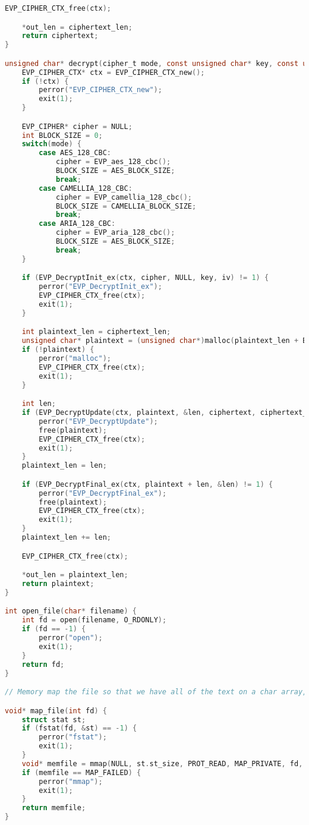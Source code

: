 \documentclass{article}
\begin{document}
\begin{lstlisting}[language=C]
    EVP_CIPHER_CTX_free(ctx);

    *out_len = ciphertext_len;
    return ciphertext;
}

unsigned char* decrypt(cipher_t mode, const unsigned char* key, const unsigned char* iv, const unsigned char* ciphertext, int ciphertext_len, int* out_len) {
    EVP_CIPHER_CTX* ctx = EVP_CIPHER_CTX_new();
    if (!ctx) {
        perror("EVP_CIPHER_CTX_new");
        exit(1);
    }

    EVP_CIPHER* cipher = NULL;
    int BLOCK_SIZE = 0;
    switch(mode) {
        case AES_128_CBC:
            cipher = EVP_aes_128_cbc();
            BLOCK_SIZE = AES_BLOCK_SIZE;
            break;
        case CAMELLIA_128_CBC:
            cipher = EVP_camellia_128_cbc();
            BLOCK_SIZE = CAMELLIA_BLOCK_SIZE;
            break;
        case ARIA_128_CBC:
            cipher = EVP_aria_128_cbc();
            BLOCK_SIZE = AES_BLOCK_SIZE;
            break;
    }

    if (EVP_DecryptInit_ex(ctx, cipher, NULL, key, iv) != 1) {
        perror("EVP_DecryptInit_ex");
        EVP_CIPHER_CTX_free(ctx);
        exit(1);
    }

    int plaintext_len = ciphertext_len;
    unsigned char* plaintext = (unsigned char*)malloc(plaintext_len + BLOCK_SIZE);
    if (!plaintext) {
        perror("malloc");
        EVP_CIPHER_CTX_free(ctx);
        exit(1);
    }

    int len;
    if (EVP_DecryptUpdate(ctx, plaintext, &len, ciphertext, ciphertext_len) != 1) {
        perror("EVP_DecryptUpdate");
        free(plaintext);
        EVP_CIPHER_CTX_free(ctx);
        exit(1);
    }
    plaintext_len = len;

    if (EVP_DecryptFinal_ex(ctx, plaintext + len, &len) != 1) {
        perror("EVP_DecryptFinal_ex");
        free(plaintext);
        EVP_CIPHER_CTX_free(ctx);
        exit(1);
    }
    plaintext_len += len;

    EVP_CIPHER_CTX_free(ctx);

    *out_len = plaintext_len;
    return plaintext;
}

int open_file(char* filename) {
    int fd = open(filename, O_RDONLY);
    if (fd == -1) {
        perror("open");
        exit(1);
    }
    return fd;
}

// Memory map the file so that we have all of the text on a char array, removing the overhead of reading the file while benchmarking.

void* map_file(int fd) {
    struct stat st;
    if (fstat(fd, &st) == -1) {
        perror("fstat");
        exit(1);
    }
    void* memfile = mmap(NULL, st.st_size, PROT_READ, MAP_PRIVATE, fd, 0);
    if (memfile == MAP_FAILED) {
        perror("mmap");
        exit(1);
    }
    return memfile;
}


\end{lstlisting}
\end{document}
